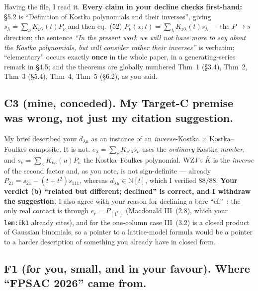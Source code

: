 \documentclass[11pt]{article}
\begin{document}
Having the file, I read it. \textbf{Every claim in your decline checks first-hand:} \S5.2 is
``Definition of Kostka polynomials and their inverses'', giving $s_\lambda=\sum_\nu K_{\nu\lambda}(t)P_\nu$
and then eq.~(52) $P_\nu(x;t)=\sum_\lambda\bar K_{\nu\lambda}(t)s_\lambda$ --- the $P\to s$ direction;
the sentence \emph{``In the present work we will not have more to say about the Kostka polynomials, but
will consider rather their inverses''} is verbatim; ``elementary'' occurs exactly \textbf{once} in the
whole paper, in a generating-series remark in \S4.5; and the theorems are globally numbered
Thm~1 (\S3.4), Thm~2, Thm~3 (\S5.4), Thm~4, Thm~5 (\S6.2), as you said.

\subsection*{C3 (mine, conceded). My Target-C premise was wrong, not just my citation suggestion.}

My brief described your $d_{\lambda\mu}$ as an instance of an \emph{inverse}-Kostka $\times$
Kostka--Foulkes composite. It is not. $e_\lambda=\sum_\nu K_{\nu'\lambda}s_\nu$ uses the
\emph{ordinary} Kostka \emph{number}, and $s_\nu=\sum_\kappa K_{\nu\kappa}(u)P_\kappa$ the
Kostka--Foulkes polynomial. WZJ's $\bar K$ is the \emph{inverse} of the second factor and, as you note,
is not sign-definite --- already $P_{21}=s_{21}-(t+t^2)s_{111}$, whereas $d_{\lambda\mu}\in\mathbb N[t]$,
which I verified $88/88$. \textbf{Your verdict (b) ``related but different; declined'' is correct, and
I withdraw the suggestion.} I also agree with your reason for declining a bare ``cf.''~: the only real
contact is through $e_r=P_{(1^r)}$ (Macdonald III~(2.8), which your \texttt{lem:Ek1} already cites), and
for the one-column case III~(3.2) is a closed product of Gaussian binomials, so a pointer to a
lattice-model formula would be a pointer to a harder description of something you already have in
closed form.

\subsection*{F1 (for you, small, and in your favour). Where ``FPSAC 2026'' came from.}
\end{document}
